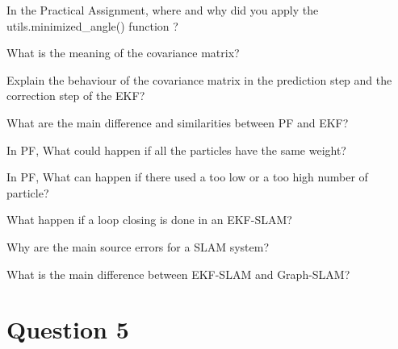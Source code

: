 \documentclass[parcial]{lcc}
\begin{document}
\maketitle




\ejercicio In the Practical Assignment, where and why did you apply the utils.minimized\_angle() function ?

\ejercicio What is the meaning of the covariance matrix?

\ejercicio Explain the behaviour of the covariance matrix in the prediction step and the correction step of the EKF?

\ejercicio What are the main difference and similarities between PF and EKF?

\ejercicio In PF, What could happen if all the particles have the same weight?

\ejercicio In PF, What can happen if there used a too low or a too high number of particle?

\ejercicio What happen if a loop closing is done in an EKF-SLAM?


\ejercicio Why are the main source errors for a SLAM system?

\ejercicio What is the main difference between EKF-SLAM and Graph-SLAM?


\section*{Question 5}
\end{document}
